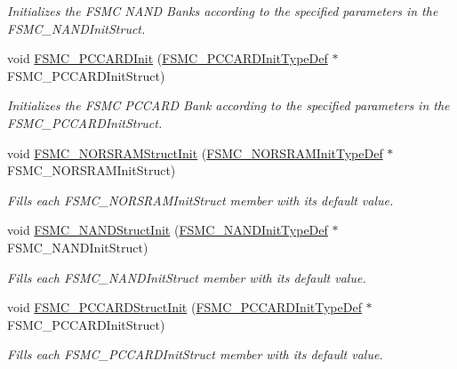 \begin{DoxyCompactItemize}
\begin{DoxyCompactList}\small\item\em Initializes the F\+S\+MC N\+A\+ND Banks according to the specified parameters in the F\+S\+M\+C\+\_\+\+N\+A\+N\+D\+Init\+Struct. \end{DoxyCompactList}\item 
void \hyperlink{group___f_s_m_c___exported___functions_gacee1351363e7700a296faa1734a910aa}{F\+S\+M\+C\+\_\+\+P\+C\+C\+A\+R\+D\+Init} (\hyperlink{struct_f_s_m_c___p_c_c_a_r_d_init_type_def}{F\+S\+M\+C\+\_\+\+P\+C\+C\+A\+R\+D\+Init\+Type\+Def} $\ast$F\+S\+M\+C\+\_\+\+P\+C\+C\+A\+R\+D\+Init\+Struct)
\begin{DoxyCompactList}\small\item\em Initializes the F\+S\+MC P\+C\+C\+A\+RD Bank according to the specified parameters in the F\+S\+M\+C\+\_\+\+P\+C\+C\+A\+R\+D\+Init\+Struct. \end{DoxyCompactList}\item 
void \hyperlink{group___f_s_m_c___exported___functions_gaf33e6dfc34f62d16a0cb416de9e83d28}{F\+S\+M\+C\+\_\+\+N\+O\+R\+S\+R\+A\+M\+Struct\+Init} (\hyperlink{struct_f_s_m_c___n_o_r_s_r_a_m_init_type_def}{F\+S\+M\+C\+\_\+\+N\+O\+R\+S\+R\+A\+M\+Init\+Type\+Def} $\ast$F\+S\+M\+C\+\_\+\+N\+O\+R\+S\+R\+A\+M\+Init\+Struct)
\begin{DoxyCompactList}\small\item\em Fills each F\+S\+M\+C\+\_\+\+N\+O\+R\+S\+R\+A\+M\+Init\+Struct member with its default value. \end{DoxyCompactList}\item 
void \hyperlink{group___f_s_m_c___exported___functions_ga8283ad94ad8e83d49d5b77d1c7e17862}{F\+S\+M\+C\+\_\+\+N\+A\+N\+D\+Struct\+Init} (\hyperlink{struct_f_s_m_c___n_a_n_d_init_type_def}{F\+S\+M\+C\+\_\+\+N\+A\+N\+D\+Init\+Type\+Def} $\ast$F\+S\+M\+C\+\_\+\+N\+A\+N\+D\+Init\+Struct)
\begin{DoxyCompactList}\small\item\em Fills each F\+S\+M\+C\+\_\+\+N\+A\+N\+D\+Init\+Struct member with its default value. \end{DoxyCompactList}\item 
void \hyperlink{group___f_s_m_c___exported___functions_ga7a64ba0e0545b3f1913c9d1d28c05e62}{F\+S\+M\+C\+\_\+\+P\+C\+C\+A\+R\+D\+Struct\+Init} (\hyperlink{struct_f_s_m_c___p_c_c_a_r_d_init_type_def}{F\+S\+M\+C\+\_\+\+P\+C\+C\+A\+R\+D\+Init\+Type\+Def} $\ast$F\+S\+M\+C\+\_\+\+P\+C\+C\+A\+R\+D\+Init\+Struct)
\begin{DoxyCompactList}\small\item\em Fills each F\+S\+M\+C\+\_\+\+P\+C\+C\+A\+R\+D\+Init\+Struct member with its default value. \end{DoxyCompactList}\item 

\end{DoxyCompactItemize}
